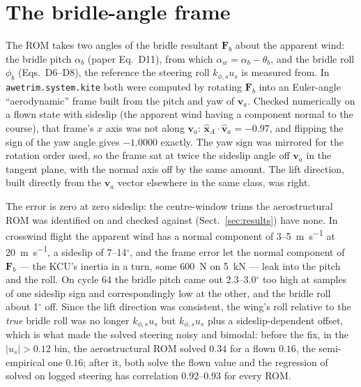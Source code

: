 \documentclass[11pt,a4paper]{article}
\newcommand{\code}[1]{\texttt{\small #1}}
\begin{document}
\section{The bridle-angle frame}
\label{sec:frame}
The ROM takes two angles of the bridle resultant $\mathbf F_b$ about the
apparent wind: the bridle pitch $\alpha_b$ (paper Eq.~D11), from which
$\alpha_w=\alpha_b-\theta_b$, and the bridle roll $\phi_b$ (Eqs.~D6--D8), the
reference the steering roll $k_{\phi,s}u_s$ is measured from. In
\code{awetrim.system.kite} both were computed by rotating $\mathbf F_b$ into
an Euler-angle ``aerodynamic'' frame built from the pitch and yaw of
$\mathbf v_a$. Checked numerically on a flown state with sideslip (the
apparent wind having a component normal to the course), that frame's $x$ axis
was not along $\mathbf v_a$: $\hat{\mathbf x}_A\cdot\hat{\mathbf v}_a=-0.97$,
and flipping the sign of the yaw angle gives $-1.0000$ exactly. The yaw sign
was mirrored for the rotation order used, so the frame sat at twice the
sideslip angle off $\mathbf v_a$ in the tangent plane, with the normal axis
off by the same amount. The lift direction, built directly from the
$\mathbf v_a$ vector elsewhere in the same class, was right.

The error is zero at zero sideslip: the centre-window trims the
aerostructural ROM was identified on and checked against
(Sect.~\ref{sec:results}) have none. In crosswind flight the apparent wind
has a normal component of 3--\SI{5}{\metre\per\second} at
\SI{20}{\metre\per\second}, a sideslip of 7--14$^\circ$, and the frame error
let the normal component of $\mathbf F_b$ --- the KCU's inertia in a turn,
some \SI{600}{\newton} on \SI{5}{\kilo\newton} --- leak into the pitch and
the roll. On cycle 64 the bridle pitch came out 2.3--3.0$^\circ$ too high at
samples of one sideslip sign and correspondingly low at the other, and the
bridle roll about 1$^\circ$ off. Since the lift direction was consistent, the
wing's roll relative to the \emph{true} bridle roll was no longer
$k_{\phi,s}u_s$ but $k_{\phi,s}u_s$ plus a sideslip-dependent offset, which
is what made the solved steering noisy and bimodal: before the fix, in the
$|u_s|>0.12$ bin, the aerostructural ROM solved $0.34$ for a flown $0.16$,
the semi-empirical one $0.16$; after it, both solve the flown value and the
regression of solved on logged steering has correlation 0.92--0.93 for every
ROM.
\end{document}
